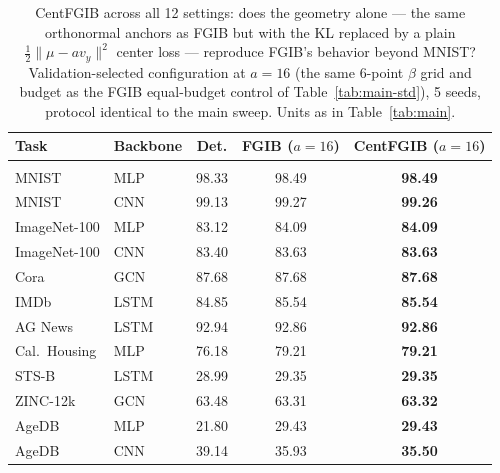 \begin{table}[t]
\caption{CentFGIB across all 12 settings: does the geometry alone --- the same orthonormal anchors as FGIB but with the KL replaced by a plain $\tfrac12\|\mu - a v_y\|^2$ center loss --- reproduce FGIB's behavior beyond MNIST? Validation-selected configuration at $a=16$ (the same 6-point $\beta$ grid and budget as the FGIB equal-budget control of Table~\ref{tab:main-std}), 5 seeds, protocol identical to the main sweep. Units as in Table~\ref{tab:main}.}
\label{tab:centfgib}
\begin{center}\small
\begin{tabular}{llccc}
Task & Backbone & Det. & FGIB ($a{=}16$) & CentFGIB ($a{=}16$) \\ \hline \\[-1.8ex]
MNIST & MLP & 98.33 & 98.49 & \textbf{98.49} \\
MNIST & CNN & 99.13 & 99.27 & \textbf{99.26} \\
ImageNet-100 & MLP & 83.12 & 84.09 & \textbf{84.09} \\
ImageNet-100 & CNN & 83.40 & 83.63 & \textbf{83.63} \\
Cora & GCN & 87.68 & 87.68 & \textbf{87.68} \\
IMDb & LSTM & 84.85 & 85.54 & \textbf{85.54} \\
AG News & LSTM & 92.94 & 92.86 & \textbf{92.86} \\
Cal.\ Housing & MLP & 76.18 & 79.21 & \textbf{79.21} \\
STS-B & LSTM & 28.99 & 29.35 & \textbf{29.35} \\
ZINC-12k & GCN & 63.48 & 63.31 & \textbf{63.32} \\
AgeDB & MLP & 21.80 & 29.43 & \textbf{29.43} \\
AgeDB & CNN & 39.14 & 35.93 & \textbf{35.50} \\
\end{tabular}\end{center}\end{table}
